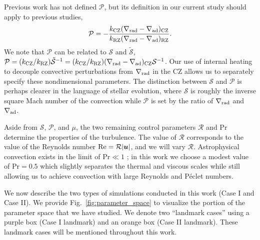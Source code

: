 \documentclass[twocolumn, linenumbers]{aastex631}
\newcommand{\gradrad}{\ensuremath{\nabla_{\rm{rad}}}}
\newcommand{\gradad}{\ensuremath{\nabla_{\rm{ad}}}}
\newcommand{\mP}{\ensuremath{\mathcal{P}}}
\newcommand{\mR}{\ensuremath{\mathcal{R}}}
\newcommand{\mS}{\ensuremath{\mathcal{S}}}
\newcommand\Pran{\ensuremath{\mathrm{Pr}}}
\renewcommand{\vec}[1]{\boldsymbol{#1}}
\newcommand{\editone}[1]{#1}
\begin{document}
\editone{
    Previous work has not defined $\mP$, but its definition in our current study should apply to previous studies,
    \begin{equation}
        \mP = -\frac{k_{\rm{CZ}}(\gradrad - \gradad)_{\rm{CZ}}}{k_{\rm{RZ}}(\gradrad - \gradad)_{\rm{RZ}}}.
    \end{equation}
    We note that $\mP$ can be related to $\mS$ and $\tilde{\mS}$, $\mP = (k_{\rm{CZ}}/k_{\rm{RZ}}) \tilde{\mS}^{-1} = (k_{\rm{CZ}}/k_{\rm{RZ}}) (\gradrad - \gradad)_{\rm{CZ}} \mS^{-1}$.
    Our use of internal heating to decouple convective perturbations from $\gradrad$ in the CZ allows us to separately specify these nondimensional parameters.
    The distinction between $\mS$ and $\mP$ is perhaps clearer in the language of stellar evolution, where $\mS$ is roughly the inverse square Mach number of the convection while $\mP$ is set by the ratio of $\gradrad$ and $\gradad$.
}

Aside from $\mS$, $\mP$, and $\mu$, the two remaining control parameters $\mR$ and $\Pran$ determine the properties of the turbulence.
The value of $\mR$ corresponds to the value of the Reynolds number $\rm{Re} = \mR |\vec{u}|$, and we will vary $\mR$.
Astrophysical convection exists in the limit of $\Pran \ll 1$ \citep{garaud2021}; in this work we choose a modest value of $\Pran = 0.5$ which slightly separates the thermal and viscous scales while still allowing us to achieve convection with large Reynolds and P\'{e}clet numbers.

We now describe the two types of simulations conducted in this work (Case I and Case II).
We provide Fig.~\ref{fig:parameter_space} to visualize the portion of the parameter space that we have studied.
We denote two ``landmark cases'' using a purple box (Case I landmark) and an orange box (Case II landmark).
These landmark cases will be mentioned throughout this work.
\end{document}

